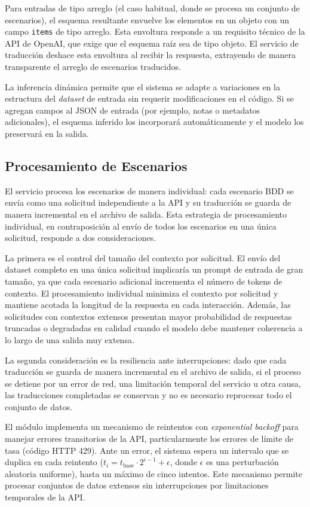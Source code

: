 Para entradas de tipo arreglo (el caso habitual, donde se procesa un conjunto de escenarios), el esquema resultante envuelve los elementos en un objeto con un campo \texttt{items} de tipo arreglo. Esta envoltura responde a un requisito técnico de la API de OpenAI, que exige que el esquema raíz sea de tipo objeto. El servicio de traducción deshace esta envoltura al recibir la respuesta, extrayendo de manera transparente el arreglo de escenarios traducidos.

La inferencia dinámica permite que el sistema se adapte a variaciones en la estructura del \textit{dataset} de entrada sin requerir modificaciones en el código. Si se agregan campos al JSON de entrada (por ejemplo, notas o metadatos adicionales), el esquema inferido los incorporará automáticamente y el modelo los preservará en la salida.

\subsection{Procesamiento de Escenarios}

El servicio procesa los escenarios de manera individual: cada escenario BDD se envía como una solicitud independiente a la API y su traducción se guarda de manera incremental en el archivo de salida. Esta estrategia de procesamiento individual, en contraposición al envío de todos los escenarios en una única solicitud, responde a dos consideraciones.

La primera es el control del tamaño del contexto por solicitud. El envío del dataset completo en una única solicitud implicaría un prompt de entrada de gran tamaño, ya que cada escenario adicional incrementa el número de tokens de contexto. El procesamiento individual minimiza el contexto por solicitud y mantiene acotada la longitud de la respuesta en cada interacción. Además, las solicitudes con contextos extensos presentan mayor probabilidad de respuestas truncadas o degradadas en calidad cuando el modelo debe mantener coherencia a lo largo de una salida muy extensa.

La segunda consideración es la resiliencia ante interrupciones: dado que cada traducción se guarda de manera incremental en el archivo de salida, si el proceso se detiene por un error de red, una limitación temporal del servicio u otra causa, las traducciones completadas se conservan y no es necesario reprocesar todo el conjunto de datos.

El módulo implementa un mecanismo de reintentos con \textit{exponential backoff} para manejar errores transitorios de la API, particularmente los errores de límite de tasa (código HTTP 429). Ante un error, el sistema espera un intervalo que se duplica en cada reintento ($t_i = t_{\text{base}} \cdot 2^{i-1} + \epsilon$, donde $\epsilon$ es una perturbación aleatoria uniforme), hasta un máximo de cinco intentos. Este mecanismo permite procesar conjuntos de datos extensos sin interrupciones por limitaciones temporales de la API.

